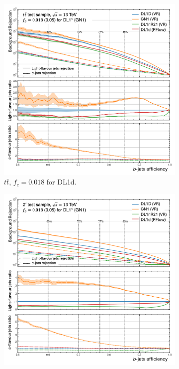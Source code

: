 \clearpage
\vspace*{\fill}
\begin{figure}[h!]
  \centering
  \begin{subfigure}[t]{0.48\textwidth}
    \centering
    \includegraphics[width=\textwidth]{Images/FTAG/VRDL1d/ROC/ttb.png}
    \caption{$t\bar{t}$, $f_c = 0.018$ for DL1d.}
    \label{fig:dl1dVRROCtt}
  \end{subfigure}
  \begin{subfigure}[t]{0.48\textwidth}
    \centering
    \includegraphics[width=\textwidth]{Images/FTAG/VRDL1d/ROC/zpb.png}

\end{subfigure}
\end{figure}
